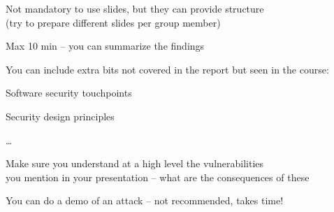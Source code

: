 \documentclass[Screen16to9,17pt]{foils}
\begin{document}
\begin{list1}
\item Not mandatory to use slides, but they can provide structure\\
  (try to prepare different slides per group member)
\item Max 10 min -- you can summarize the findings
\item You can include extra bits not covered in the report but seen in the course:
  \begin{list2}
  \item Software security touchpoints
  \item Security design principles
  \item \ldots
  \end{list2}
\item Make sure you understand at a high level the vulnerabilities\\
  you mention in your presentation -- what are the consequences of these
  \item You can do a demo of an attack -- not recommended, takes time!
\end{list1}
\end{document}
